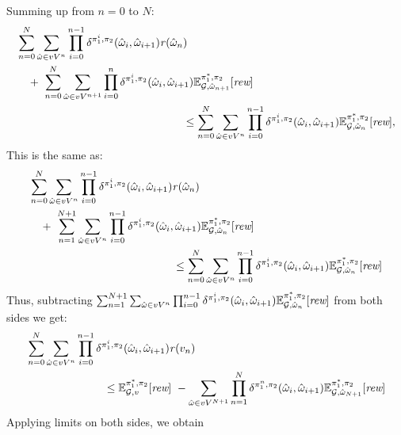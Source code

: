\begin{myproof}
  Summing up from $n=0$ to $N$:
  \begin{align*}
    & \sum^{N}_{n=0}\sum_{\hat{\omega} \in vV^{n}} \prod^{n-1}_{i=0}\delta^{\strat{1}^i,\strat{2}}(\hat{\omega}_i,\hat{\omega}_{i+1}) \reward(\hat{\omega}_n) \\
    & \quad + \ \sum^{N}_{n=0} \sum_{\hat{\omega} \in vV^{n+1}} \prod^{n}_{i=0}\delta^{\strat{1}^i,\strat{2}}(\hat{\omega}_i,\hat{\omega}_{i+1})  \Expect{\starredstrat{1}}{\strat{2}}_{\StochG,\hat{\omega}_{n+1}}[\Rewards] \\
    & \hspace{15em} \leq 
	\sum^{N}_{n=0}
	\sum_{\hat{\omega} \in vV^{n}} \prod^{n-1}_{i=0}\delta^{\strat{1}^i,\strat{2}}(\hat{\omega}_i, \hat{\omega}_{i+1}) \Expect{\starredstrat{1}}{\strat{2}}_{\StochG,\hat{\omega}_n}[\Rewards],
  \end{align*}
  This is the same as:
  \begin{align*}
    & \sum^{N}_{n=0}\sum_{\hat{\omega} \in vV^{n}} \prod^{n-1}_{i=0}\delta^{\strat{1}^i,\strat{2}}(\hat{\omega}_i,\hat{\omega}_{i+1}) \reward(\hat{\omega}_n) \\
    & \quad + \
	\sum^{N+1}_{n=1} \sum_{\hat{\omega} \in vV^{n}} \prod^{n-1}_{i=0}\delta^{\strat{1}^i,\strat{2}}(\hat{\omega}_i,\hat{\omega}_{i+1})  \Expect{\starredstrat{1}}{\strat{2}}_{\StochG,\hat{\omega}_{n}}[\Rewards] \\
    & \hspace{13em} \leq 
	 \sum^{N}_{n=0}
	\sum_{\hat{\omega} \in vV^{n}} \prod^{n-1}_{i=0}\delta^{\strat{1}^i,\strat{2}}(\hat{\omega}_i, \hat{\omega}_{i+1}) \Expect{\starredstrat{1}}{\strat{2}}_{\StochG,\hat{\omega}_n}[\Rewards]
  \end{align*}
  Thus, subtracting $\sum^{N+1}_{n=1} \sum_{\hat{\omega} \in vV^{n}} \prod^{n-1}_{i=0}\delta^{\pi_{1}^i,\pi_{2}}(\hat{\omega}_i,\hat{\omega}_{i+1})  \mathbb{E}^{\pi^*_{1}, \pi_{2}}_{\mathcal{G},\hat{\omega}_{n}}[\textit{rew}]$ from both sides we get:
  \begin{align*}
    & \sum^{N}_{n=0}\sum_{\hat{\omega} \in vV^{n}} \prod^{n-1}_{i=0}\delta^{\pi_{1}^i,\pi_{2}}(\hat{\omega}_i, \hat{\omega}_{i+1}) \mathit{r}(v_n)\\
    & \hspace{7em} \leq 
      \mathbb{E}^{\pi^*_{1}, \pi_{2}}_{\mathcal{G},v}[\textit{rew}] \ - \sum_{\hat{\omega} \in vV^{N+1}}\prod^{N}_{n=1}\delta^{\pi_{1}^n,\pi_{2}}(\hat{\omega}_i,\hat{\omega}_{i+1}) \mathbb{E}^{\pi^*_{1}, \pi_{2}}_{\mathcal{G}, \hat{\omega}_{N+1}}[\textit{rew}]
  \end{align*}
  Applying limits on both sides, we obtain


\end{myproof}
